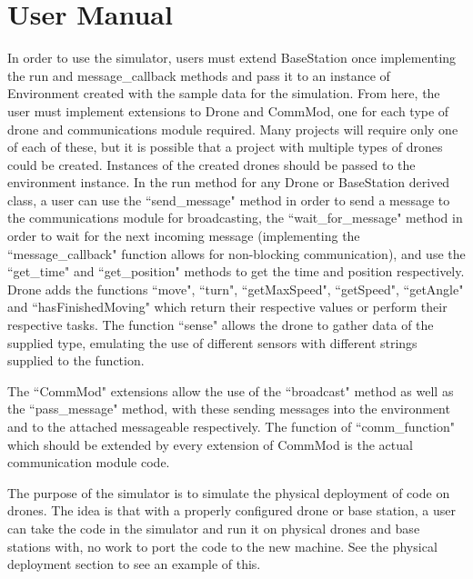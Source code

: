 \section{User Manual}
	In order to use the simulator, users must extend BaseStation once implementing the run and message\_callback methods and pass it to an
	instance of Environment created with the sample data for the simulation. From here, the user must implement extensions to Drone and CommMod,
	one for each type of drone and communications module required. Many projects will require only one of each of these, but it is
	possible that a project with multiple types of drones could be created. Instances of the created drones should be passed to
	the environment instance. In the run method for any Drone or BaseStation derived class, a user can use the ``send\_message" method
	in order to send a message to the communications module for broadcasting, the ``wait\_for\_message" method in order to wait for
	the next incoming message (implementing the ``message\_callback" function allows for non-blocking communication), and use the
	``get\_time" and ``get\_position" methods to get the time and position respectively. Drone adds the functions ``move", ``turn",
	``getMaxSpeed", ``getSpeed", ``getAngle" and ``hasFinishedMoving" which return their respective values or perform their respective tasks. The
	function ``sense" allows the drone to gather data of the supplied type, emulating the use of different sensors with different strings supplied to the
	function.

	The ``CommMod" extensions allow the use of the ``broadcast" method as well as the ``pass\_message" method, with these sending
	messages into the environment and to the attached messageable respectively. The function of ``comm\_function" which should be
	extended by every extension of CommMod is the actual communication module code.

	The purpose of the simulator is to simulate the physical deployment of code on drones. The idea is that with a properly
	configured drone or base station, a user can take the code in the simulator and run it on physical drones and base stations
	with, no work to port the code to the new machine. See the physical deployment section to see an example of this.
